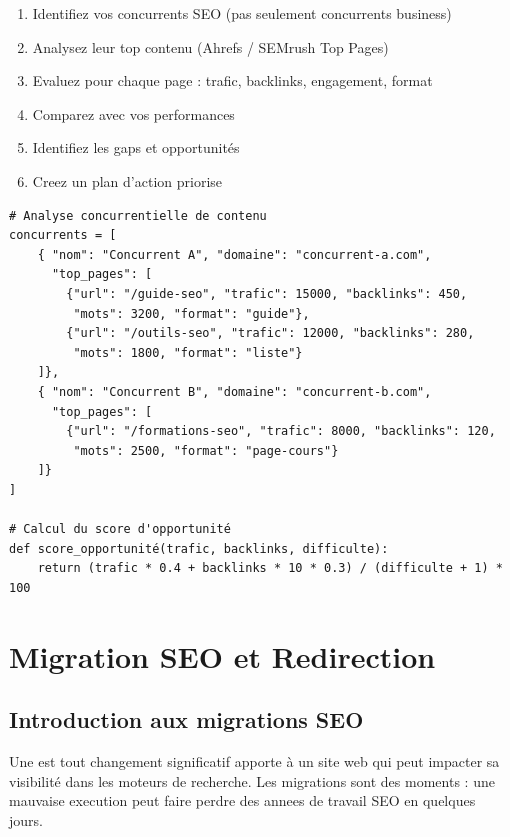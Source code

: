 \begin{enumerate}
    \item Identifiez vos concurrents SEO (pas seulement concurrents business)
    \item Analysez leur top contenu (Ahrefs / SEMrush Top Pages)
    \item Evaluez pour chaque page : trafic, backlinks, engagement, format
    \item Comparez avec vos performances
    \item Identifiez les gaps et opportunités
    \item Creez un plan d'action priorise
\end{enumerate}

\begin{lstlisting}[style=code,caption={Structure d'analyse concurrentielle (tableau de benchmark)}]
# Analyse concurrentielle de contenu
concurrents = [
    { "nom": "Concurrent A", "domaine": "concurrent-a.com",
      "top_pages": [
        {"url": "/guide-seo", "trafic": 15000, "backlinks": 450,
         "mots": 3200, "format": "guide"},
        {"url": "/outils-seo", "trafic": 12000, "backlinks": 280,
         "mots": 1800, "format": "liste"}
    ]},
    { "nom": "Concurrent B", "domaine": "concurrent-b.com",
      "top_pages": [
        {"url": "/formations-seo", "trafic": 8000, "backlinks": 120,
         "mots": 2500, "format": "page-cours"}
    ]}
]

# Calcul du score d'opportunité
def score_opportunité(trafic, backlinks, difficulte):
    return (trafic * 0.4 + backlinks * 10 * 0.3) / (difficulte + 1) * 100
\end{lstlisting}


\chapter{Migration SEO et Redirection}
\label{ch:migration}

\section{Introduction aux migrations SEO}

Une  est tout changement significatif apporte à un site web qui peut impacter sa visibilité dans les moteurs de recherche. Les migrations sont des moments  : une mauvaise execution peut faire perdre des annees de travail SEO en quelques jours.


